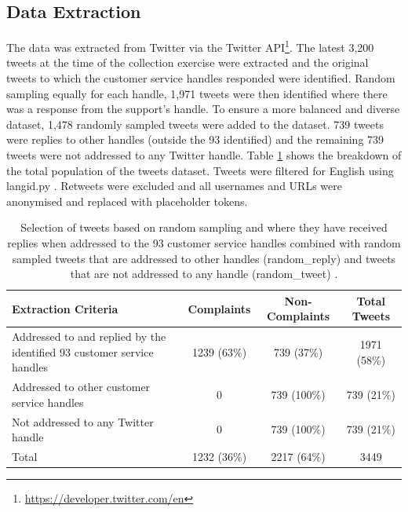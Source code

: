 \subsection{Data Extraction}
The data was extracted from Twitter via the Twitter API\footnote{\url{https://developer.twitter.com/en}}. The latest 3,200 tweets at the time of the collection exercise were extracted and the original tweets to which the customer service handles responded were identified. Random sampling equally for each handle, 1,971 tweets were then identified where there was a response from the support's handle. To ensure a more balanced and diverse dataset, 1,478 randomly sampled tweets were added to the dataset. 739 tweets were replies to other handles (outside the 93 identified) and the remaining 739 tweets were not addressed to any Twitter handle. Table \ref{tab: tweet_counts} shows the breakdown of the total population of the tweets dataset. Tweets were filtered for English using langid.py \cite{luiLangidPyOfftheshelf2012}. Retweets were excluded and all usernames and URLs were anonymised and replaced with placeholder tokens.
\begin{table}[ht]
    \captionsetup{font=small}
    \small
    \centering
    \begin{tabularx}{\textwidth}{|X|c|c|c|}
        \hline
        \rowcolor[gray]{0.7}
        \textbf{Extraction Criteria}                                           & \textbf{Complaints} & \textbf{Non-Complaints} & \textbf{Total Tweets} \\
        \hline
        Addressed to and replied by the identified 93 customer service handles & 1239 \small{(63\%)} & 739 \small{(37\%)}      & 1971 \small{(58\%)}   \\
        \rowcolor[gray]{0.9}
        Addressed to other customer service handles                            & 0                   & 739 \small{(100\%)}     & 739 \small{(21\%)}    \\
        Not addressed to any Twitter handle                                    & 0                   & 739 \small{(100\%)}     & 739 \small{(21\%)}    \\
        \hline
        \rowcolor[gray]{0.9}
        Total                                                                  & 1232 \small{(36\%)} & 2217 \small{(64\%)}     & 3449                  \\
        \hline
    \end{tabularx}
    \caption{Selection of tweets based on random sampling and where they have received replies when addressed to the 93 customer service handles combined with random sampled tweets that are addressed to other handles (random\_reply) and tweets that are not addressed to any handle (random\_tweet) \cite{preotiuc-pietro_automatically_2019}.}
    \label{tab: tweet_counts}
\end{table}

